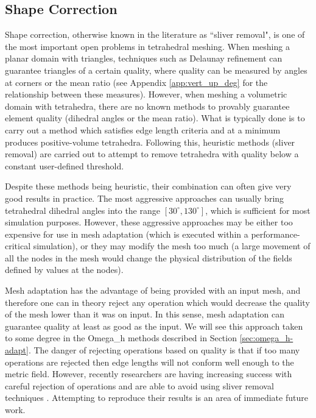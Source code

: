 \subsection{Shape Correction}
\label{sec:ma_shape}

Shape correction, otherwise known in the literature as ``sliver removal",
is one of the most important open problems in tetrahedral meshing.
When meshing a planar domain with triangles, techniques such as
Delaunay refinement can guarantee triangles of a certain quality,
where quality can be measured by angles at corners or the
mean ratio (see Appendix \ref{app:vert_up_deg} for the relationship
between these measures).
However, when meshing a volumetric domain with tetrahedra, there
are no known methods to provably guarantee element quality (dihedral angles
or the mean ratio).
What is typically done is to carry out a method which satisfies
edge length criteria and at a minimum produces positive-volume
tetrahedra.
Following this, heuristic methods (sliver removal) are carried out
to attempt to remove tetrahedra with quality below a constant user-defined
threshold.

Despite these methods being heuristic, their combination can often
give very good results in practice.
The most aggressive approaches
\cite{klingner2008aggressive,dassi2016tetrahedral}
can usually bring tetrahedral dihedral angles into
the range $[30^\circ,130^\circ]$, which is sufficient for
most simulation purposes.
However, these aggressive approaches may be either too expensive
for use in mesh adaptation (which is executed within a
performance-critical simulation), or they may modify the mesh
too much (a large movement of all the nodes in the mesh would
change the physical distribution of the fields defined by values
at the nodes).

Mesh adaptation has the advantage of being provided with an input
mesh, and therefore one can in theory reject any operation which
would decrease the quality of the mesh lower than it was on input.
In this sense, mesh adaptation can guarantee quality at least as good
as the input.
We will see this approach taken to some degree in the Omega\_h methods
described in Section \ref{sec:omega_h-adapt}.
The danger of rejecting operations based on quality is that
if too many operations are rejected then edge lengths will
not conform well enough to the metric field.
However, recently researchers are having increasing success with
careful rejection of operations and are able to avoid using
sliver removal techniques \cite{loseille20093d,michal2012anisotropic}.
Attempting to reproduce their results is an area of immediate future work.

